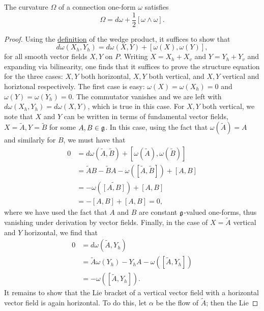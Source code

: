 \begin{lem}
    \label{lem:curvature_structure}
    The curvature $\Omega$ of a connection one-form $\omega$ satisfies 
    \begin{equation}
        \Omega=d\omega + \frac{1}{2}[\omega\wedge\omega].
        \label{eq:curvature_structure}
    \end{equation}
\end{lem}
\begin{proof}
    Using the \hyperref[defn:wedge]{definition} of the wedge product, it suffices to show that
    \[d\omega(X_h,Y_h)=d\omega(X,Y)+[\omega(X),\omega(Y)],\]
    for all smooth vector fields $X,Y$ on $P$. Writing $X=X_h+X_v$ and $Y=Y_h+Y_v$ and expanding
    via bilinearity, one finds that it suffices to prove the structure equation for the three cases:
    $X,Y$ both horizontal, $X,Y$ both vertical, and $X,Y$ vertical and horiztonal respectively.
    The first case is easy: $\omega(X)=\omega(X_h)=0$ and $\omega(Y)=\omega(Y_h)=0$. The commutator vanishes
    and we are left with $d\omega(X_h,Y_h)=d\omega(X,Y)$, which is true in this case. For $X,Y$ both
    vertical, we note that $X$ and $Y$ can be written in terms of fundamental vector fields, $X=\tilde A,Y=\tilde B$
    for some $A,B\in\mathfrak g$. In this case, using the fact that $\omega(\tilde A)=A$ and similarly for $B$, we must have that
    \begin{align*}
        0&=d\omega(\tilde A,\tilde B)+[\omega(\tilde A),\omega(\tilde B)]\\
        &=\tilde AB-\tilde BA-\omega\left([\tilde A,\tilde B]\right)+[A,B]\\
        &=-\omega\left(\widetilde{[A,B]}\right)+[A,B]\\
        &=-[A,B]+[A,B]=0,
    \end{align*}
    where we have used the fact that $A$ and $B$ are constant $\mathfrak g$-valued one-forms, thus vanishing under
    derivation by vector fields. Finally, in the case of $X=\tilde A$ vertical and $Y$ horizontal, we find that
    \begin{align*}
        0&=d\omega(\tilde A,Y_h)\\
        &=\tilde A\omega(Y_h)-Y_hA-\omega([\tilde A,Y_h])\\
        &=-\omega([\tilde A,Y_h]).
    \end{align*}
    It remains to show that the Lie bracket of a vertical vector field with a horizontal vector field is again
    horizontal. To do this, let $\alpha$ be the flow of $\tilde A$; then the Lie

\end{proof}
